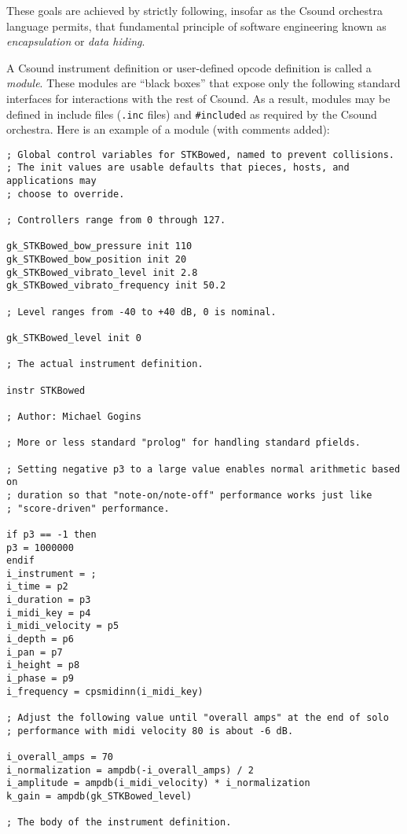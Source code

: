 \documentclass[12pt,letterpaper,onecolumn]{scrartcl}
\begin{document}
\noindent These goals are achieved by strictly following, insofar as the 
Csound 
orchestra language permits, that fundamental principle of software engineering 
known as \emph{encapsulation} or \emph{data hiding}. 

A Csound instrument definition or user-defined opcode definition is called a 
\emph{module}. These modules are ``black boxes'' that expose only the following 
standard interfaces for interactions with the rest of Csound. As a result, 
modules may be defined in include files (\texttt{.inc} files) and 
\texttt{\#include}d as required by the Csound orchestra. Here is an example of 
a module (with comments added):

\begin{lstlisting}
; Global control variables for STKBowed, named to prevent collisions.
; The init values are usable defaults that pieces, hosts, and applications may 
; choose to override.

; Controllers range from 0 through 127.

gk_STKBowed_bow_pressure init 110
gk_STKBowed_bow_position init 20
gk_STKBowed_vibrato_level init 2.8 
gk_STKBowed_vibrato_frequency init 50.2

; Level ranges from -40 to +40 dB, 0 is nominal.

gk_STKBowed_level init 0

; The actual instrument definition.

instr STKBowed

; Author: Michael Gogins

; More or less standard "prolog" for handling standard pfields.

; Setting negative p3 to a large value enables normal arithmetic based on 
; duration so that "note-on/note-off" performance works just like 
; "score-driven" performance.

if p3 == -1 then
p3 = 1000000
endif
i_instrument = ; 
i_time = p2
i_duration = p3
i_midi_key = p4
i_midi_velocity = p5
i_depth = p6
i_pan = p7
i_height = p8
i_phase = p9
i_frequency = cpsmidinn(i_midi_key)

; Adjust the following value until "overall amps" at the end of solo 
; performance with midi velocity 80 is about -6 dB.

i_overall_amps = 70
i_normalization = ampdb(-i_overall_amps) / 2
i_amplitude = ampdb(i_midi_velocity) * i_normalization
k_gain = ampdb(gk_STKBowed_level)

; The body of the instrument definition.


\end{lstlisting}
\end{document}
